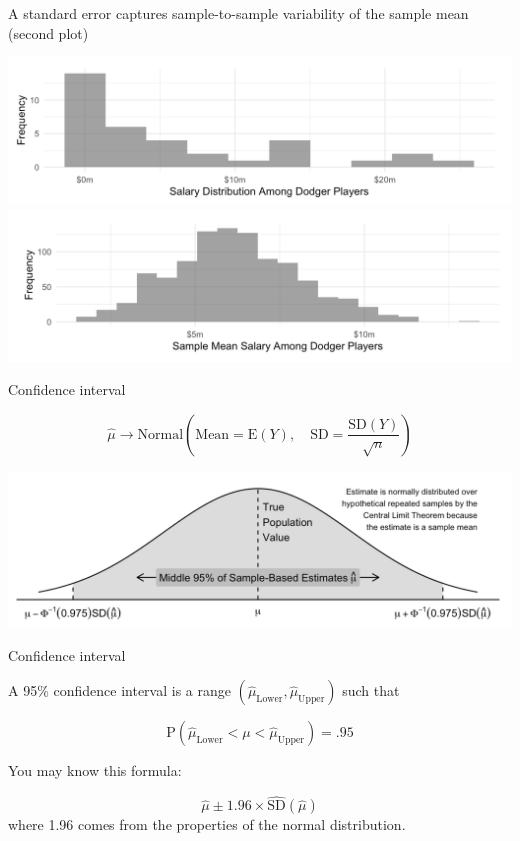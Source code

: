 \documentclass{beamer}
\begin{document}
\begin{frame}{A standard error captures sample-to-sample variability of the sample mean (second plot)}

\includegraphics[width = \textwidth]{figures/clt_before}
\includegraphics[width = \textwidth]{figures/clt_after}


\end{frame}

\begin{frame}{Confidence interval}

$$
\hat\mu \rightarrow \text{Normal}\left(\text{Mean} = \text{E}(Y),\quad \text{SD} = \frac{\text{SD}(Y)}{\sqrt{n}}\right)
$$

\includegraphics[width = \textwidth]{figures/sampling_distribution}

\end{frame}

\begin{frame}{Confidence interval}

A 95\% confidence interval is a range $(\hat\mu_\text{Lower},\hat\mu_\text{Upper})$ such that

$$\text{P}(\hat\mu_\text{Lower} < \mu < \hat\mu_\text{Upper}) = .95$$

You may know this formula:

$$
\hat\mu \pm 1.96\times \widehat{\text{SD}}(\hat\mu)
$$
where 1.96 comes from the properties of the normal distribution.
\end{frame}
\end{document}
